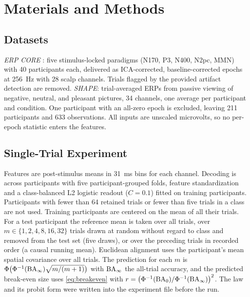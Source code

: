 \section{Materials and Methods}
\subsection{Datasets}
\emph{ERP CORE} \cite{kappenman2021erpcore}: five stimulus-locked paradigms (N170, P3, N400, N2pc, MMN) with 40 participants each, delivered as ICA-corrected, baseline-corrected epochs at 256~Hz with 28 scalp channels. Trials flagged by the provided artifact detection are removed. \emph{SHAPE}: trial-averaged ERPs from passive viewing of negative, neutral, and pleasant pictures, 34 channels, one average per participant and condition. One participant with an all-zero epoch is excluded, leaving 211 participants and 633 observations. All inputs are unscaled microvolts, so no per-epoch statistic enters the features.

\subsection{Single-Trial Experiment}
Features are post-stimulus means in 31~ms bins for each channel. Decoding is across participants with five participant-grouped folds, feature standardization and a class-balanced L2 logistic readout ($C=0.1$) fitted on training participants. Participants with fewer than 64 retained trials or fewer than five trials in a class are not used. Training participants are centered on the mean of all their trials. For a test participant the reference mean is taken over all trials, over $m\in\{1,2,4,8,16,32\}$ trials drawn at random without regard to class and removed from the test set (five draws), or over the preceding trials in recorded order (a causal running mean). Euclidean alignment uses the participant's mean spatial covariance over all trials. The prediction for each $m$ is $\Phi\big(\Phi^{-1}(\mathrm{BA}_\infty)\sqrt{m/(m+1)}\big)$ with $\mathrm{BA}_\infty$ the all-trial accuracy, and the predicted break-even size uses \eqref{eq:breakeven} with $r=\big(\Phi^{-1}(\mathrm{BA}_0)/\Phi^{-1}(\mathrm{BA}_\infty)\big)^2$. The law and its probit form were written into the experiment file before the run.

